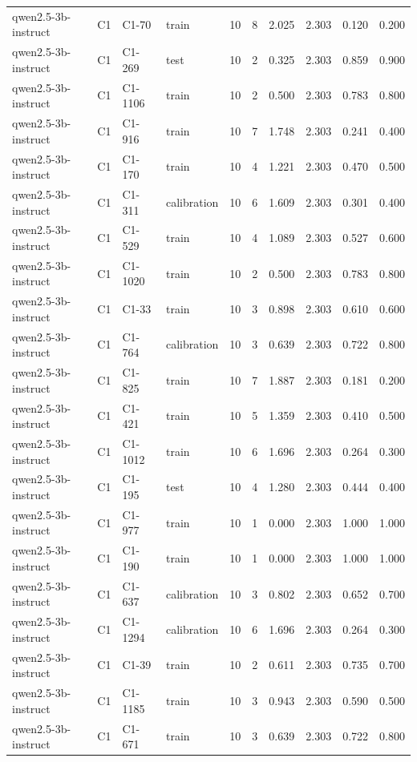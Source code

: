 \begin{table}
\begin{tabular}{llllrrrrrr}
qwen2.5-3b-instruct & C1 & C1-70 & train & 10 & 8 & 2.025 & 2.303 & 0.120 & 0.200 \\
qwen2.5-3b-instruct & C1 & C1-269 & test & 10 & 2 & 0.325 & 2.303 & 0.859 & 0.900 \\
qwen2.5-3b-instruct & C1 & C1-1106 & train & 10 & 2 & 0.500 & 2.303 & 0.783 & 0.800 \\
qwen2.5-3b-instruct & C1 & C1-916 & train & 10 & 7 & 1.748 & 2.303 & 0.241 & 0.400 \\
qwen2.5-3b-instruct & C1 & C1-170 & train & 10 & 4 & 1.221 & 2.303 & 0.470 & 0.500 \\
qwen2.5-3b-instruct & C1 & C1-311 & calibration & 10 & 6 & 1.609 & 2.303 & 0.301 & 0.400 \\
qwen2.5-3b-instruct & C1 & C1-529 & train & 10 & 4 & 1.089 & 2.303 & 0.527 & 0.600 \\
qwen2.5-3b-instruct & C1 & C1-1020 & train & 10 & 2 & 0.500 & 2.303 & 0.783 & 0.800 \\
qwen2.5-3b-instruct & C1 & C1-33 & train & 10 & 3 & 0.898 & 2.303 & 0.610 & 0.600 \\
qwen2.5-3b-instruct & C1 & C1-764 & calibration & 10 & 3 & 0.639 & 2.303 & 0.722 & 0.800 \\
qwen2.5-3b-instruct & C1 & C1-825 & train & 10 & 7 & 1.887 & 2.303 & 0.181 & 0.200 \\
qwen2.5-3b-instruct & C1 & C1-421 & train & 10 & 5 & 1.359 & 2.303 & 0.410 & 0.500 \\
qwen2.5-3b-instruct & C1 & C1-1012 & train & 10 & 6 & 1.696 & 2.303 & 0.264 & 0.300 \\
qwen2.5-3b-instruct & C1 & C1-195 & test & 10 & 4 & 1.280 & 2.303 & 0.444 & 0.400 \\
qwen2.5-3b-instruct & C1 & C1-977 & train & 10 & 1 & 0.000 & 2.303 & 1.000 & 1.000 \\
qwen2.5-3b-instruct & C1 & C1-190 & train & 10 & 1 & 0.000 & 2.303 & 1.000 & 1.000 \\
qwen2.5-3b-instruct & C1 & C1-637 & calibration & 10 & 3 & 0.802 & 2.303 & 0.652 & 0.700 \\
qwen2.5-3b-instruct & C1 & C1-1294 & calibration & 10 & 6 & 1.696 & 2.303 & 0.264 & 0.300 \\
qwen2.5-3b-instruct & C1 & C1-39 & train & 10 & 2 & 0.611 & 2.303 & 0.735 & 0.700 \\
qwen2.5-3b-instruct & C1 & C1-1185 & train & 10 & 3 & 0.943 & 2.303 & 0.590 & 0.500 \\
qwen2.5-3b-instruct & C1 & C1-671 & train & 10 & 3 & 0.639 & 2.303 & 0.722 & 0.800 \\

\end{tabular}
\end{table}
